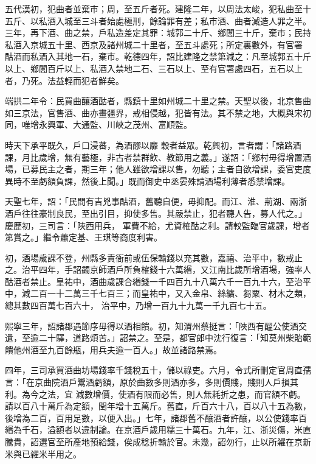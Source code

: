 \begin{pinyinscope}
 五代漢初，犯曲者並棄市；周，至五斤者死。建隆二年，以周法太峻，犯私曲至十五斤、以私酒入城至三斗者始處極刑，餘論罪有差；私市酒、曲者減造人罪之半。三年，再下酒、曲之禁，戶私造差定其罪：城郭二十斤、鄉閭三十斤，棄市；民持私酒入京城五十里、西京及諸州城二十里者，至五斗處死；所定裏數外，有官署
 酤酒而私酒入其地一石，棄市。乾德四年，詔比建隆之禁第減之：凡至城郭五十斤以上、鄉閭百斤以上、私酒入禁地二石、三石以上、至有官署處四石，五石以上者，乃死。法益輕而犯者鮮矣。



 端拱二年令：民買曲釀酒酤者，縣鎮十里如州城二十里之禁。天聖以後，北京售曲如三京法，官售酒、曲亦畫疆界，戒相侵越，犯皆有法。其不禁之地，大概與宋初同，唯增永興軍、大通監、川峽之茂州、富順監。



 時天下承平既久，戶口浸蕃，為酒醪以靡
 穀者益眾。乾興初，言者謂：「諸路酒課，月比歲增，無有藝極，非古者禁群飲、教節用之義。」遂詔：「鄉村毋得增置酒場，已募民主之者，期三年；他人雖欲增課以售，勿聽；主者自欲增課，委官吏度異時不至虧額負課，然後上聞。」既而御史中丞晏殊請酒場利薄者悉禁增課。



 天聖七年，詔：「民間有吉兇事酤酒，舊聽自便，毋抑配。而江、淮、荊湖、兩浙酒戶往往豪制良民，至出引目，抑使多售。其嚴禁止，犯者聽人告，募人代之。」慶歷初，三司言：「陜西用兵，
 軍費不給，尤資榷酤之利。請較監臨官歲課，增者第賞之。」繼令蕭定基、王琪等商度利害。



 初，酒場歲課不登，州縣多責衙前或伍保輸錢以充其數，嘉禧、治平中，數戒止之。治平四年，手詔蠲京師酒戶所負榷錢十六萬緡，又江南比歲所增酒場，強率人酤酒者禁止。皇祐中，酒曲歲課合緡錢一千四百九十八萬六千一百九十六，至治平中，減二百一十二萬三千七百三；而皇祐中，又入金帛、絲纊、芻粟、材木之類，總其數四百萬七百六十，
 治平中，乃增一百九十九萬一千九百七十五。



 熙寧三年，詔諸郡遇節序毋得以酒相饋。初，知渭州蔡挺言：「陜西有醞公使酒交遺，至逾二十驛，道路煩苦。」詔禁之。至是，都官郎中沈行復言：「知莫州柴貽範饋他州酒至九百餘瓶，用兵夫逾一百人。」故並諸路禁焉。



 四年，三司承買酒曲坊場錢率千錢稅五十，儲以祿吏。六月，令式所刪定官周直孺言：「在京曲院酒戶鬻酒虧額，原於曲數多則酒亦多，多則價賤，賤則人戶損其利。為今之法，宜
 減數增價，使酒有限而必售，則人無耗折之患，而官額不虧。請以百八十萬斤為定額，閏年增十五萬斤。舊直，斤百六十八，百以八十五為數，後增為二百，百用足數，以便入出。」七年，諸郡舊不釀酒者許釀，以公使錢率百緡為千石，溢額者以違制論。在京酒戶歲用糯三十萬石。九年，江、浙災傷，米直騰貴，詔選官至所產地預給錢，俟成稔折輸於官。未幾，詔勿行，止以所糴在京新米與已糴米半用之。




\end{pinyinscope}
